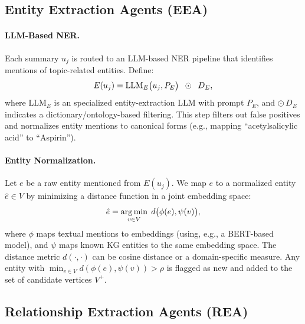 \documentclass{article}
\begin{document}
\subsection{Entity Extraction Agents (EEA)}

\paragraph{LLM-Based NER.}
Each summary $u_j$ is routed to an LLM-based NER pipeline that identifies mentions of topic-related entities. Define:
\begin{equation}
\fontsize{9pt}{5pt}\selectfont
E(u_j) 
= \mathrm{LLM}_{E}\bigl(u_j, P_{E}\bigr)
\;\;\odot\;\; D_E,
\label{eq:extraction_eea}
\end{equation}
where $\mathrm{LLM}_{E}$ is an specialized entity-extraction LLM with prompt $P_E$, and $\odot \, D_E$ indicates a dictionary/ontology-based filtering. This step filters out false positives and normalizes entity mentions to canonical forms (e.g., mapping ``acetylsalicylic acid'' to ``Aspirin'').

\paragraph{Entity Normalization.}
Let $e$ be a raw entity mentioned from $E(u_j)$. We map $e$ to a normalized entity $\hat{e}\in V$ by minimizing a distance function in a joint embedding space:
\begin{equation}
\fontsize{9pt}{7pt}\selectfont
\hat{e}
= \operatorname*{arg\,min}_{v \in V} \; d\bigl(\phi(e), \psi(v)\bigr),
\label{eq:ent_normalization}
\end{equation}
where $\phi$ maps textual mentions to embeddings (using, e.g., a BERT-based model), and $\psi$ maps known KG entities to the same embedding space. The distance metric $d(\cdot,\cdot)$ can be cosine distance or a domain-specific measure. Any entity with $\min_{v \in V} d(\phi(e), \psi(v)) > \rho$ is flagged as new and added to the set of candidate vertices $V^{+}$.

\subsection{Relationship Extraction Agents (REA)}
\end{document}
